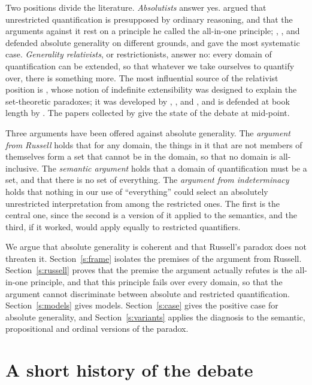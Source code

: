 \documentclass{situationist-preprint}
\begin{document}
Two positions divide the literature. \emph{Absolutists} answer yes. \citet{Cartwright1994} argued that unrestricted quantification is presupposed by ordinary reasoning, and that the arguments against it rest on a principle he called the all-in-one principle; \citet{Lewis1991}, \citet{Boolos1984}, \citet{McGee2000} and \citet{Williamson2003} defended absolute generality on different grounds, and \citet{Williamson2003} gave the most systematic case. \emph{Generality relativists}, or restrictionists, answer no: every domain of quantification can be extended, so that whatever we take ourselves to quantify over, there is something more. The most influential source of the relativist position is \citet{Dummett1991}, whose notion of indefinite extensibility was designed to explain the set-theoretic paradoxes; it was developed by \citet{Parsons1974}, \citet{Glanzberg2004}, \citet{Fine2006} and \citet{Hellman2006}, and is defended at book length by \citet{Studd2019}. The papers collected by \citet{RayoUzquiano2006} give the state of the debate at mid-point.

Three arguments have been offered against absolute generality. The \emph{argument from Russell} holds that for any domain, the things in it that are not members of themselves form a set that cannot be in the domain, so that no domain is all-inclusive. The \emph{semantic argument} holds that a domain of quantification must be a set, and that there is no set of everything. The \emph{argument from indeterminacy} holds that nothing in our use of \enquote{everything} could select an absolutely unrestricted interpretation from among the restricted ones. The first is the central one, since the second is a version of it applied to the semantics, and the third, if it worked, would apply equally to restricted quantifiers.

We argue that absolute generality is coherent and that Russell's paradox does not threaten it. Section~\ref{s:frame} isolates the premises of the argument from Russell. Section~\ref{s:russell} proves that the premise the argument actually refutes is the all-in-one principle, and that this principle fails over every domain, so that the argument cannot discriminate between absolute and restricted quantification. Section~\ref{s:models} gives models. Section~\ref{s:case} gives the positive case for absolute generality, and Section~\ref{s:variants} applies the diagnosis to the semantic, propositional and ordinal versions of the paradox.

\section{A short history of the debate}\label{s:history}
\end{document}
